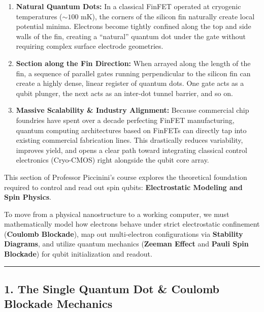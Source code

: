 \documentclass[
]{article}
\providecommand{\tightlist}{%
  \setlength{\itemsep}{0pt}\setlength{\parskip}{0pt}}
\begin{document}
\begin{enumerate}
\def\labelenumi{\arabic{enumi}.}
\tightlist
\item
  \textbf{Natural Quantum Dots:} In a classical FinFET operated at
  cryogenic temperatures (\(\sim 100\text{ mK}\)), the corners of the
  silicon fin naturally create local potential minima. Electrons become
  tightly confined along the top and side walls of the fin, creating a
  ``natural'' quantum dot under the gate without requiring complex
  surface electrode geometries.
\item
  \textbf{Section along the Fin Direction:} When arrayed along the
  length of the fin, a sequence of parallel gates running perpendicular
  to the silicon fin can create a highly dense, linear register of
  quantum dots. One gate acts as a qubit plunger, the next acts as an
  inter-dot tunnel barrier, and so on.
\item
  \textbf{Massive Scalability \& Industry Alignment:} Because commercial
  chip foundries have spent over a decade perfecting FinFET
  manufacturing, quantum computing architectures based on FinFETs can
  directly tap into existing commercial fabrication lines. This
  drastically reduces variability, improves yield, and opens a clear
  path toward integrating classical control electronics (Cryo-CMOS)
  right alongside the qubit core array.
\end{enumerate}

This section of Professor Piccinini's course explores the theoretical
foundation required to control and read out spin qubits:
\textbf{Electrostatic Modeling and Spin Physics}.

To move from a physical nanostructure to a working computer, we must
mathematically model how electrons behave under strict electrostatic
confinement (\textbf{Coulomb Blockade}), map out multi-electron
configurations via \textbf{Stability Diagrams}, and utilize quantum
mechanics (\textbf{Zeeman Effect} and \textbf{Pauli Spin Blockade}) for
qubit initialization and readout.

\begin{center}\rule{0.5\linewidth}{0.5pt}\end{center}

\subsection{1. The Single Quantum Dot \& Coulomb Blockade
Mechanics}\label{the-single-quantum-dot-coulomb-blockade-mechanics}
\end{document}
